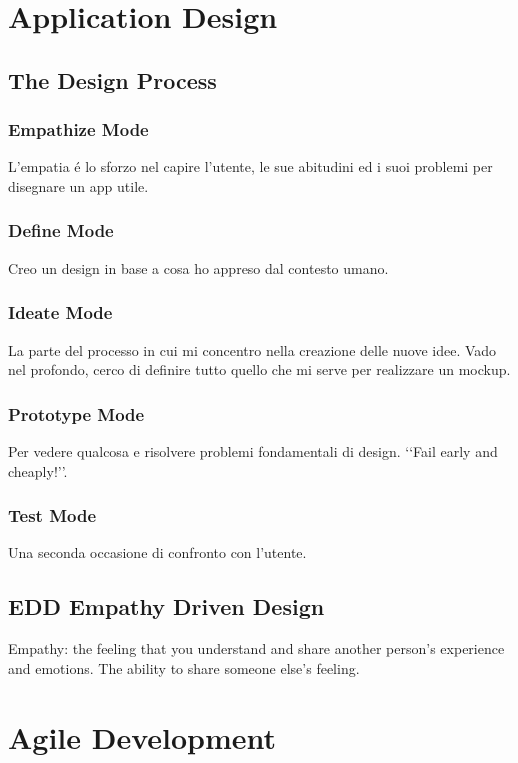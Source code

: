 \chapter{Application Design}
\section{The Design Process}
\subsection{Empathize Mode}
L'empatia \'e lo sforzo nel capire l'utente, le sue abitudini ed i suoi problemi per disegnare un app utile.

\subsection{Define Mode}
Creo un design in base a cosa ho appreso dal contesto umano.

\subsection{Ideate Mode}
La parte del processo in cui mi concentro nella creazione delle nuove idee. 
Vado nel profondo, cerco di definire tutto quello che mi serve per realizzare un mockup.

\subsection{Prototype Mode}
Per vedere qualcosa e risolvere problemi fondamentali di design. \lq\lq Fail early and cheaply!\rq\rq .

\subsection{Test Mode}
Una seconda occasione di confronto con l'utente.

\section{EDD Empathy Driven Design}
Empathy: the feeling that you understand and share another person's experience and emotions. 
The ability to share someone else's feeling.

\chapter{Agile Development}

